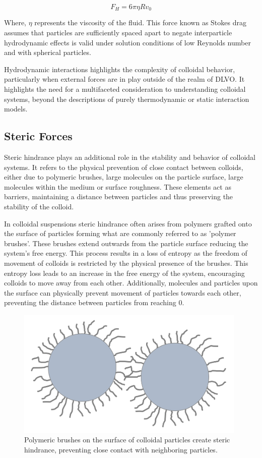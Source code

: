 \begin{equation}
F_H = 6 \pi \eta R v_0
\label{Stokesdrag}
\end{equation}

Where, \( \eta \) represents the viscosity of the fluid. This force known as Stokes drag assumes that particles are sufficiently spaced apart to negate interparticle hydrodynamic effects is valid under solution conditions of low Reynolds number and with spherical particles.\cite{naudascher1991hydrodynamic}

Hydrodynamic interactions highlights the complexity of colloidal behavior, particularly when external forces are in play outside of the realm of DLVO. It highlights the need for a multifaceted consideration to understanding colloidal systems, beyond the descriptions of purely thermodynamic or static interaction models.

\subsection{Steric Forces}

Steric hindrance plays an additional role in the stability and behavior of colloidal systems. It refers to the physical prevention of close contact between colloids, either due to polymeric brushes, large molecules on the particle surface, large molecules within the medium or surface roughness. These elements act as barriers, maintaining a distance between particles and thus preserving the stability of the colloid.

In colloidal suspensions steric hindrance often arises from polymers grafted onto the surface of particles forming what are commonly referred to as 'polymer brushes'. These brushes extend outwards from the particle surface reducing the system's free energy. This process results in a loss of entropy as the freedom of movement of colloids is restricted by the physical presence of the brushes. This entropy loss leads to an increase in the free energy of the system, encouraging colloids to move away from each other. Additionally, molecules and particles upon the surface can physically prevent movement of particles towards each other, preventing the distance between particles from reaching 0. 

\begin{figure}[h!!!!]
    \centering
    \includegraphics[width=110mm]{chapter1/brushy.PNG}
    \caption{Polymeric brushes on the surface of colloidal particles create steric hindrance, preventing close contact with neighboring particles.}
    \label{fig:brushy}
\end{figure}


